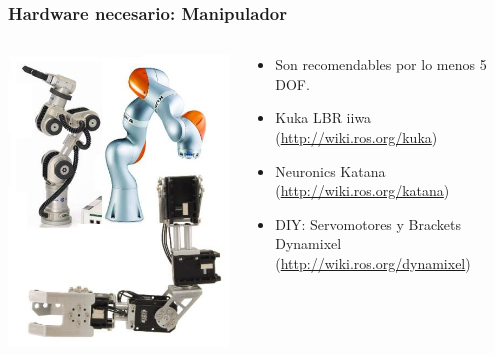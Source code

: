 \documentclass[10pt,spanish,aspectratio=1610]{beamer}
\begin{document}
\begin{frame}\frametitle{Hardware necesario: Manipulador}
  \begin{columns}
    \begin{column}{0.4\textwidth}
      \includegraphics[width=\textwidth]{Figures/arms.jpg}
    \end{column}
    \begin{column}{0.5\textwidth}
      \begin{itemize}
      \item Son recomendables por lo menos 5 DOF.
      \item Kuka LBR iiwa (\url{http://wiki.ros.org/kuka})
      \item Neuronics Katana (\url{http://wiki.ros.org/katana})
      \item DIY: Servomotores y Brackets Dynamixel (\url{http://wiki.ros.org/dynamixel})
      \end{itemize}
    \end{column}
  \end{columns}
\end{frame}
\end{document}
